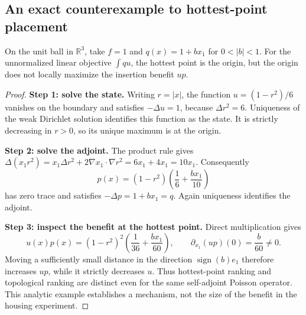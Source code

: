 \subsection{An exact counterexample to hottest-point placement}
\begin{proposition}
On the unit ball in $\mathbb R^3$, take $f=1$ and
$q(x)=1+b x_1$ for $0<|b|<1$. For the unnormalized linear objective
$\int q u$, the hottest point is the origin, but the origin does not
locally maximize the insertion benefit $up$.
\end{proposition}
\begin{proof}
\textbf{Step 1: solve the state.} Writing $r=|x|$, the function
$u=(1-r^2)/6$ vanishes on the boundary and satisfies $-\Delta u=1$,
because $\Delta r^2=6$. Uniqueness of the weak Dirichlet solution
identifies this function as the state. It is strictly decreasing in
$r>0$, so its unique maximum is at the origin.

\textbf{Step 2: solve the adjoint.} The product rule gives
$\Delta(x_1r^2)=x_1\Delta r^2+2\nabla x_1\cdot\nabla r^2
=6x_1+4x_1=10x_1$. Consequently
\[
 p(x)=(1-r^2)\left(\frac16+\frac{b x_1}{10}\right)
\]
has zero trace and satisfies $-\Delta p=1+b x_1=q$.
Again uniqueness identifies the adjoint.

\textbf{Step 3: inspect the benefit at the hottest point.}
Direct multiplication gives
\[
 u(x)p(x)=(1-r^2)^2\left(\frac1{36}+\frac{b x_1}{60}\right),
 \qquad \partial_{x_1}(up)(0)=\frac b{60}\ne0.
\]
Moving a sufficiently small distance in the direction
$\operatorname{sign}(b)e_1$ therefore increases $up$, while it
strictly decreases $u$. Thus hottest-point ranking and topological
ranking are distinct even for the same self-adjoint Poisson operator.
This analytic example establishes a mechanism, not the size of the
benefit in the housing experiment.
\end{proof}

